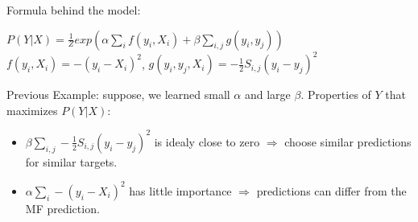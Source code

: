 \documentclass{beamer}
\begin{document}
\begin{frame}
\begin{center}
\end{center}
\end{frame}

\begin{frame}
Formula behind the model:
\begin{Definition}
$P(Y|X) = \frac{1}{Z}exp(\alpha\sum\limits_{i}f(y_i,X_i)+\beta\sum\limits_{i,j}g(y_i,y_j))$\\
$f(y_i,X_i) = -(y_i-X_i)^2$,
$g(y_i, y_j, X_i) = -\frac{1}{2}S_{i,j}(y_i-y_j)^2$
\end{Definition}
Previous Example: suppose, we learned small $\alpha$ and large $\beta$. Properties of $Y$ that maximizes $P(Y|X)$:
\begin{itemize}
\item $\beta\sum\limits_{i,j}-\frac{1}{2}S_{i,j}(y_i-y_j)^2$ is idealy close to zero $\Rightarrow$ choose similar predictions for similar targets.
\item $\alpha\sum\limits_{i} -(y_i-X_i)^2$ has little importance $\Rightarrow$ predictions can differ from the MF prediction.
\end{itemize}
\end{frame}
\end{document}
